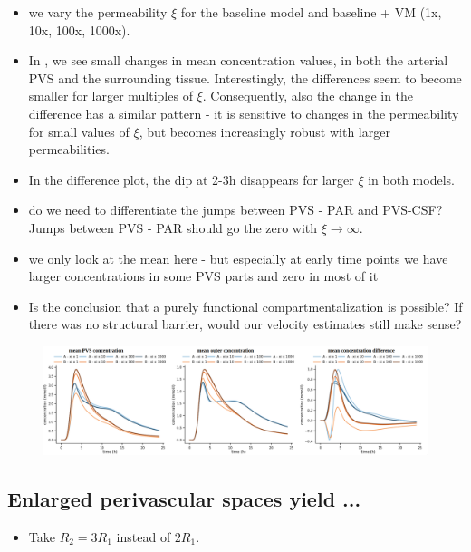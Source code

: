 \documentclass[fleqn,10pt]{wlscirep}
\begin{document}
\begin{itemize}
    \item we vary the permeability  $\xi$ for the baseline model and baseline + VM (1x, 10x, 100x, 1000x).
    \item In , we see small changes in mean concentration values, in both the arterial PVS and the surrounding tissue. Interestingly, the differences seem to become smaller for larger multiples of $\xi$. Consequently, also the change in the difference has a similar pattern - it is sensitive to changes in the permeability for small values of $\xi$, but becomes increasingly robust with larger permeabilities.
    \item In the difference plot, the dip at 2-3h disappears for larger $\xi$ in both models.
    \item do we need to differentiate the jumps between PVS - PAR and PVS-CSF? Jumps between PVS - PAR should go the zero with $\xi \rightarrow \infty$.
    \item we only look at the mean here - but especially at early time points we have larger concentrations in some PVS parts and zero in most of it
    \item Is the conclusion that a purely functional compartmentalization is possible? If there was no structural barrier, would our velocity estimates still make sense?
\end{itemize}

\begin{figure}
    \centering
    \includegraphics[width=\textwidth]{figures/figure4.png}
    \caption{}
    \label{fig:compartmentalization}
\end{figure}

\subsection*{Enlarged perivascular spaces yield ...}

\begin{itemize}
  \item Take $R_2 = 3 R_1$ instead of $2 R_1$.
\end{itemize}
\end{document}
